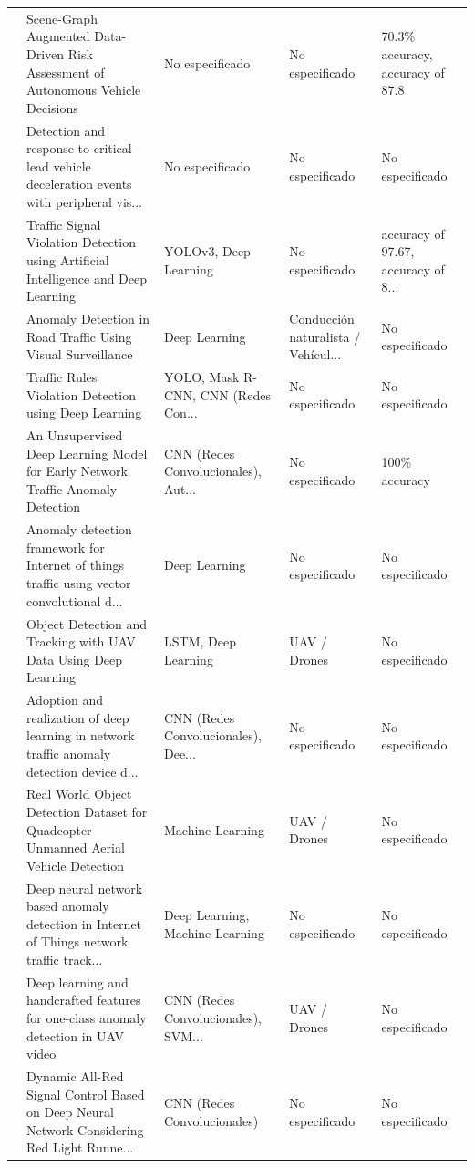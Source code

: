 \begin{table}[htbp]
\begin{tabular}{cp{7.5cm}p{2.8cm}p{2.8cm}p{2.8cm}}
\cite{yu2020scenegraph} & Scene-Graph Augmented Data-Driven Risk Assessment of Autonomous Vehicle Decisions & No especificado & No especificado & 70.3\% accuracy, accuracy of 87.8 \\
\cite{svrd2020response} & Detection and response to critical lead vehicle deceleration events with peripheral vis... & No especificado & No especificado & No especificado \\
\cite{franklin2020traffic} & Traffic Signal Violation Detection using Artificial Intelligence and Deep Learning & YOLOv3, Deep Learning & No especificado & accuracy of 97.67, accuracy of 8... \\
\cite{kumaran2020anomaly} & Anomaly Detection in Road Traffic Using Visual Surveillance & Deep Learning & Conducción naturalista / Vehícul... & No especificado \\
\cite{tonge2020traffic} & Traffic Rules Violation Detection using Deep Learning & YOLO, Mask R-CNN, CNN (Redes Con... & No especificado & No especificado \\
\cite{hwang2020unsupervised} & An Unsupervised Deep Learning Model for Early Network Traffic Anomaly Detection & CNN (Redes Convolucionales), Aut... & No especificado & 100\% accuracy \\
\cite{amma2020anomaly} & Anomaly detection framework for Internet of things traffic using vector convolutional d... & Deep Learning & No especificado & No especificado \\
\cite{micheal2020object} & Object Detection and Tracking with UAV Data Using Deep Learning & LSTM, Deep Learning & UAV / Drones & No especificado \\
\cite{wei2020adoption} & Adoption and realization of deep learning in network traffic anomaly detection device d... & CNN (Redes Convolucionales), Dee... & No especificado & No especificado \\
\cite{paweczyk2020real} & Real World Object Detection Dataset for Quadcopter Unmanned Aerial Vehicle Detection & Machine Learning & UAV / Drones & No especificado \\
\cite{reddy2020deep} & Deep neural network based anomaly detection in Internet of Things network traffic track... & Deep Learning, Machine Learning & No especificado & No especificado \\
\cite{chriki2020deep} & Deep learning and handcrafted features for one-class anomaly detection in UAV video & CNN (Redes Convolucionales), SVM... & UAV / Drones & No especificado \\
\cite{kwon2020dynamic} & Dynamic All-Red Signal Control Based on Deep Neural Network Considering Red Light Runne... & CNN (Redes Convolucionales) & No especificado & No especificado \\
\bottomrule
\end{tabular}
\end{table}




